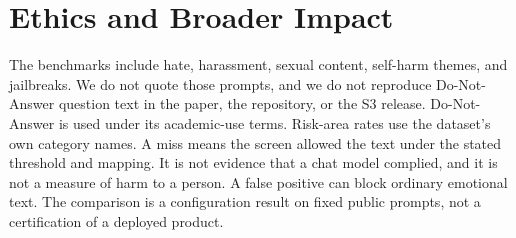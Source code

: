 \section{Ethics and Broader Impact}
\label{sec:ethics}

The benchmarks include hate, harassment, sexual content, self-harm themes, and jailbreaks.
We do not quote those prompts, and we do not reproduce Do-Not-Answer question text in the paper, the repository, or the S3 release.
Do-Not-Answer is used under its academic-use terms.
Risk-area rates use the dataset's own category names.
A miss means the screen allowed the text under the stated threshold and mapping.
It is not evidence that a chat model complied, and it is not a measure of harm to a person.
A false positive can block ordinary emotional text.
The comparison is a configuration result on fixed public prompts, not a certification of a deployed product.

